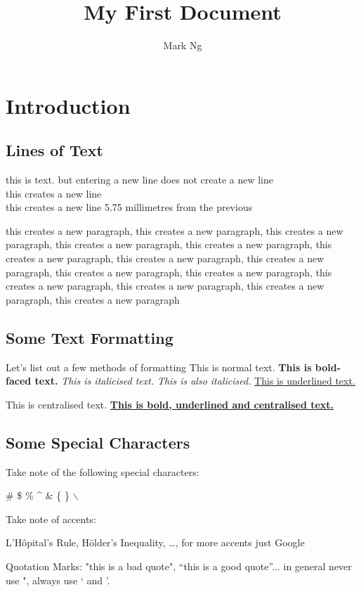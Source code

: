 \documentclass{article}
\title{My First Document}
\author{Mark Ng}
\begin{document}
    \maketitle
    \section{Introduction}
        \subsection{Lines of Text}
            this is text. but
            entering
            a new line 
            does not create a new line\\
            this creates a new line\\[5.75mm]
            this creates a new line 5.75 millimetres from the previous
            \par this creates a new paragraph, this creates a new paragraph, this creates a new paragraph, this creates a new paragraph, this creates a new paragraph, this creates a new paragraph, this creates a new paragraph, this creates a new paragraph, this creates a new paragraph, this creates a new paragraph, this creates a new paragraph, this creates a new paragraph, this creates a new paragraph, this creates a new paragraph
        \subsection{Some Text Formatting}
            Let's list out a few methods of formatting 
            This is normal text. \textbf{This is bold-faced text.} \textit{This is italicised text.} \emph{This is also italicised.} \underline{This is underlined text.}
            \begin{center}
                This is centralised text. \underline{\textbf{This is bold, underlined and centralised text.}}
            \end{center}
        \subsection{Some Special Characters}
            Take note of the following special characters:
            \begin{center}
                \# \$ \% \^{} \& \{ \} $\backslash$
            \end{center}
            Take note of accents:
            \begin{center}
                L'H\^{o}pital's Rule, H\"{o}lder's Inequality, \dots, for more accents just Google
            \end{center}
            Quotation Marks: "this is a bad quote", ``this is a good quote''... in general never use ", always use ` and '.
            \newpage
\end{document}
